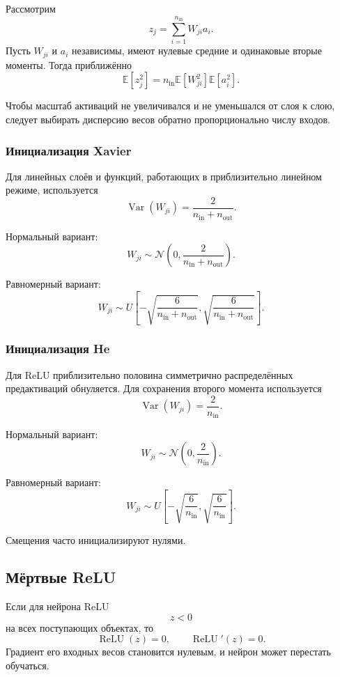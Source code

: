 \documentclass[12pt,a4paper]{article}
\theoremstyle{plain}
\theoremstyle{definition}
\theoremstyle{remark}
\newcommand{\E}{\mathbb{E}}
\begin{document}
Рассмотрим
\[
    z_j
    =
    \sum_{i=1}^{n_{\mathrm{in}}}W_{ji}a_i.
\]
Пусть $W_{ji}$ и $a_i$ независимы, имеют нулевые средние и одинаковые
вторые моменты. Тогда приближённо
\[
    \E[z_j^2]
    =
    n_{\mathrm{in}}
    \E[W_{ji}^2]
    \E[a_i^2].
\]

Чтобы масштаб активаций не увеличивался и не уменьшался от слоя к
слою, следует выбирать дисперсию весов обратно пропорционально
числу входов.

\subsubsection{Инициализация Xavier}

Для линейных слоёв и функций, работающих в приблизительно линейном
режиме, используется
\[
    \operatorname{Var}(W_{ji})
    =
    \frac{2}
    {n_{\mathrm{in}}+n_{\mathrm{out}}}.
\]

Нормальный вариант:
\[
    W_{ji}
    \sim
    \mathcal{N}
    \left(
        0,
        \frac{2}
        {n_{\mathrm{in}}+n_{\mathrm{out}}}
    \right).
\]

Равномерный вариант:
\[
    W_{ji}
    \sim
    U\left[
        -\sqrt{\frac{6}
        {n_{\mathrm{in}}+n_{\mathrm{out}}}},
        \sqrt{\frac{6}
        {n_{\mathrm{in}}+n_{\mathrm{out}}}}
    \right].
\]

\subsubsection{Инициализация He}

Для ReLU приблизительно половина симметрично распределённых
предактиваций обнуляется. Для сохранения второго момента используется
\[
    \operatorname{Var}(W_{ji})
    =
    \frac{2}{n_{\mathrm{in}}}.
\]

Нормальный вариант:
\[
    W_{ji}
    \sim
    \mathcal{N}
    \left(
        0,
        \frac{2}{n_{\mathrm{in}}}
    \right).
\]

Равномерный вариант:
\[
    W_{ji}
    \sim
    U\left[
        -\sqrt{\frac{6}{n_{\mathrm{in}}}},
        \sqrt{\frac{6}{n_{\mathrm{in}}}}
    \right].
\]

Смещения часто инициализируют нулями.

\subsection{Мёртвые ReLU}

Если для нейрона ReLU
\[
    z<0
\]
на всех поступающих объектах, то
\[
    \operatorname{ReLU}(z)=0,
    \qquad
    \operatorname{ReLU}'(z)=0.
\]
Градиент его входных весов становится нулевым, и нейрон может
перестать обучаться.
\end{document}
